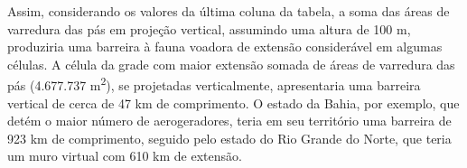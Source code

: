 \documentclass[
  oneside]{scrbook}
\begin{document}
\begin{blackbox}
Assim, considerando os valores da última coluna da tabela, a soma das áreas de varredura das pás em projeção vertical, assumindo uma altura de 100 m, produziria uma barreira à fauna voadora de extensão considerável em algumas células. A célula da grade com maior extensão somada de áreas de varredura das pás (4.677.737 m\textsuperscript{2}), se projetadas verticalmente, apresentaria uma barreira vertical de cerca de 47 km de comprimento. O estado da Bahia, por exemplo, que detém o maior número de aerogeradores, teria em seu território uma barreira de 923 km de comprimento, seguido pelo estado do Rio Grande do Norte, que teria um muro virtual com 610 km de extensão.

\end{blackbox}
\end{document}
